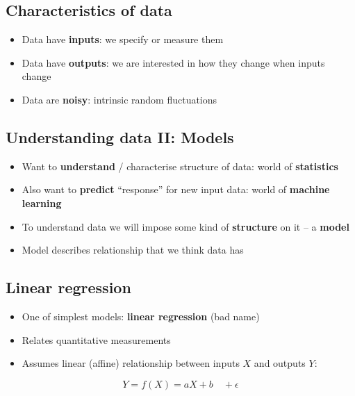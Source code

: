 \hypertarget{characteristics-of-data}{%
\subsection{Characteristics of data}\label{characteristics-of-data}}

\begin{itemize}
\item
  Data have \textbf{inputs}: we specify or measure them
\item
  Data have \textbf{outputs}: we are interested in how they change when
  inputs change
\item
  Data are \textbf{noisy}: intrinsic random fluctuations
\end{itemize}

\hypertarget{understanding-data-ii-models}{%
\subsection{Understanding data II:
Models}\label{understanding-data-ii-models}}

\begin{itemize}
\item
  Want to \textbf{understand} / characterise structure of data: world of
  \textbf{statistics}
\item
  Also want to \textbf{predict} ``response'' for new input data: world
  of \textbf{machine learning}
\item
  To understand data we will impose some kind of \textbf{structure} on
  it -- a \textbf{model}
\item
  Model describes relationship that we think data has
\end{itemize}

\hypertarget{linear-regression}{%
\subsection{Linear regression}\label{linear-regression}}

\begin{itemize}
\item
  One of simplest models: \textbf{linear regression} (bad name)
\item
  Relates quantitative measurements
\item
  Assumes linear (affine) relationship between inputs \(X\) and outputs
  \(Y\):
\end{itemize}

\[Y = f(X) = aX + b \quad + \epsilon\]

